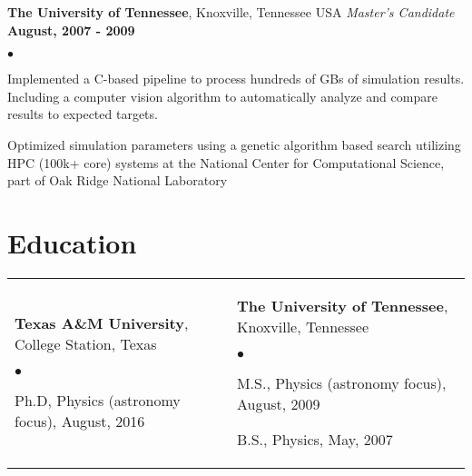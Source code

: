\documentclass[margin,line, 11pt]{res}
\newenvironment{list2}{
  \begin{list}{$\bullet$}{%
      \setlength{\itemsep}{0in}
      \setlength{\parsep}{0in} \setlength{\parskip}{0in}
      \setlength{\topsep}{0in} \setlength{\partopsep}{0in}
      \setlength{\leftmargin}{0.2in}}}{\end{list}}
\begin{document}
\begin{resume}
\textbf{The University of Tennessee}, Knoxville, Tennessee USA\newline
\textit{Master's Candidate} \hfill \textbf{August, 2007 - 2009}\newline
    \begin{list2}
    	\vspace*{-5mm}
      \item Implemented a C-based pipeline to process hundreds of GBs of simulation results. Including a computer vision algorithm to automatically analyze and compare results to expected targets.
      \item Optimized simulation parameters using a genetic algorithm based search utilizing HPC (100k+ core) systems at the National Center for Computational Science, part of Oak Ridge National Laboratory
    \end{list2}
\vspace*{-3mm}



\section{Education}
\begin{tabular}{@{}p{3in}p{3in}}
  \textbf{Texas A\&M University}, College Station, Texas
  \begin{list2}
  	\item Ph.D, Physics (astronomy focus), August, 2016
  \end{list2} &
  \textbf{The University of Tennessee}, Knoxville, Tennessee
  \begin{list2}
  	\item M.S., Physics (astronomy focus),  August, 2009
  	\item B.S., Physics,  May, 2007
  \end{list2} \\
\end{tabular}
\vspace*{-4mm}

\end{resume}
\end{document}
